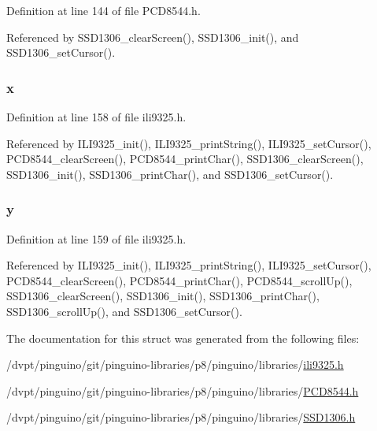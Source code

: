 Definition at line 144 of file P\-C\-D8544.\-h.



Referenced by S\-S\-D1306\-\_\-clear\-Screen(), S\-S\-D1306\-\_\-init(), and S\-S\-D1306\-\_\-set\-Cursor().

\hypertarget{structcoord__t_ae2825f524c71a19eab26e76a693473fa}{
\subsubsection[{x}]{ x}}\label{structcoord__t_ae2825f524c71a19eab26e76a693473fa}


Definition at line 158 of file ili9325.\-h.



Referenced by I\-L\-I9325\-\_\-init(), I\-L\-I9325\-\_\-print\-String(), I\-L\-I9325\-\_\-set\-Cursor(), P\-C\-D8544\-\_\-clear\-Screen(), P\-C\-D8544\-\_\-print\-Char(), S\-S\-D1306\-\_\-clear\-Screen(), S\-S\-D1306\-\_\-init(), S\-S\-D1306\-\_\-print\-Char(), and S\-S\-D1306\-\_\-set\-Cursor().

\hypertarget{structcoord__t_aae823bf8305b29bd7ace3d02c1ffe687}{
\subsubsection[{y}]{ y}}\label{structcoord__t_aae823bf8305b29bd7ace3d02c1ffe687}


Definition at line 159 of file ili9325.\-h.



Referenced by I\-L\-I9325\-\_\-init(), I\-L\-I9325\-\_\-print\-String(), I\-L\-I9325\-\_\-set\-Cursor(), P\-C\-D8544\-\_\-clear\-Screen(), P\-C\-D8544\-\_\-print\-Char(), P\-C\-D8544\-\_\-scroll\-Up(), S\-S\-D1306\-\_\-clear\-Screen(), S\-S\-D1306\-\_\-init(), S\-S\-D1306\-\_\-print\-Char(), S\-S\-D1306\-\_\-scroll\-Up(), and S\-S\-D1306\-\_\-set\-Cursor().



The documentation for this struct was generated from the following files\-:\begin{DoxyCompactItemize}
\item 
/dvpt/pinguino/git/pinguino-\/libraries/p8/pinguino/libraries/\hyperlink{ili9325_8h}{ili9325.\-h}\item 
/dvpt/pinguino/git/pinguino-\/libraries/p8/pinguino/libraries/\hyperlink{p8_2pinguino_2libraries_2_p_c_d8544_8h}{P\-C\-D8544.\-h}\item 
/dvpt/pinguino/git/pinguino-\/libraries/p8/pinguino/libraries/\hyperlink{p8_2pinguino_2libraries_2_s_s_d1306_8h}{S\-S\-D1306.\-h}\end{DoxyCompactItemize}
